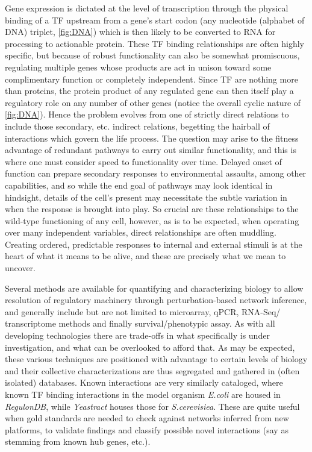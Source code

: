 Gene expression is dictated at the level of transcription through the physical binding of a TF upstream from a gene's start codon (any nucleotide (alphabet of DNA) triplet, \cref{fig:DNA}) which is then likely to be converted to RNA for processing to actionable protein. These TF binding relationships are often highly specific, but because of robust functionality can also be somewhat promiscuous, regulating multiple genes whose products are act in unison toward some complimentary function or completely independent. Since TF are nothing more than proteins, the protein product of any regulated gene can then itself play a regulatory role on any number of other genes (notice the overall cyclic nature of \cref{fig:DNA}). Hence the problem evolves from one of strictly direct relations to include those secondary, etc. indirect relations, begetting the hairball of interactions which govern the life process. The question may arise to the fitness advantage of redundant pathways to carry out similar functionality, and this is where one must consider speed to functionality over time. Delayed onset of function can prepare secondary responses to environmental assaults, among other capabilities, and so while the end goal of pathways may look identical in hindsight, details of the cell's present may necessitate the subtle variation in when the response is brought into play. So crucial are these relationships to the wild-type functioning of any cell, however, as is to be expected, when operating over many independent variables, direct relationships are often muddling. Creating ordered, predictable responses to internal and external stimuli is at the heart of what it means to be alive, and these are precisely what we mean to uncover.

Several methods are available for quantifying and characterizing biology to allow resolution of regulatory machinery through perturbation-based network inference, and generally include but are not limited to microarray, qPCR, RNA-Seq/ transcriptome methods and finally survival/phenotypic assay. As with all developing technologies there are trade-offs in what specifically is under investigation, and what can be overlooked to afford that. As may be expected, these various techniques are positioned with advantage to certain levels of biology and their collective characterizations are thus segregated and gathered in (often isolated) databases. Known interactions are very similarly cataloged, where known TF binding interactions in the model organism \emph{E.coli} are housed in \emph{RegulonDB}\cite{gama2008regulondb}, while \emph{Yeastract}\cite{teixeira2006yeastract} houses those for \emph{S.cerevisiea}. These are quite useful when gold standards are needed to check against networks inferred from new platforms, to validate findings and classify possible novel interactions (say as stemming from known hub genes, etc.).

